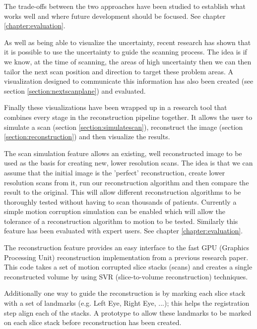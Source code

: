 The trade-offs between the two approaches have been studied to establish what works well and where future development should be focused. See chapter \ref{chapter:evaluation}.

As well as being able to visualize the uncertainty, recent research\cite{uncertaintysvd} has shown that it is possible to use the uncertainty to guide the scanning process. The idea is if we know, at the time of scanning, the areas of high uncertainty then we can then tailor the next scan position and direction to target these problem areas. A visualization designed to communicate this information has also been created (see section \ref{section:nextscanplane}) and evaluated.

Finally these visualizations have been wrapped up in a research tool that combines every stage in the reconstruction pipeline together. It allows the user to simulate a scan (section \ref{section:simulatescan}), reconstruct the image (section \ref{section:reconstruction}) and then visualize the results.

The scan simulation feature allows an existing, well reconstructed image to be used as the basis for creating new, lower resolution scans. The idea is that we can assume that the initial image is the 'perfect' reconstruction, create lower resolution scans from it, run our reconstruction algorithm and then compare the result to the original. This will allow different reconstruction algorithms to be thoroughly tested without having to scan thousands of patients. Currently a simple motion corruption simulation can be enabled which will allow the tolerance of a reconstruction algorithm to motion to be tested. Similarly this feature has been evaluated with expert users. See chapter \ref{chapter:evaluation}.

The reconstruction feature provides an easy interface to the fast GPU (Graphics Processing Unit) reconstruction implementation from a previous research paper\cite{gpureconstruction}. This code takes a set of motion corrupted slice stacks (scans) and creates a single reconstructed volume by using SVR (slice-to-volume reconstruction) techniques. 

Additionally one way to guide the reconstruction is by marking each slice stack with a set of landmarks (e.g. Left Eye, Right Eye, ...); this helps the registration step align each of the stacks. A prototype to allow these landmarks to be marked on each slice stack before reconstruction has been created.